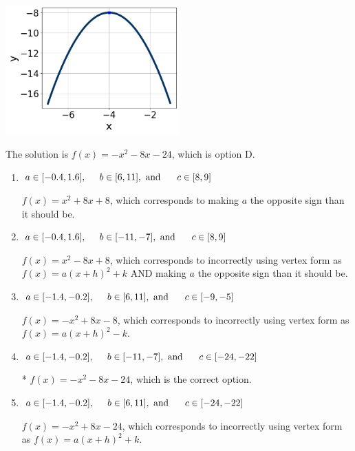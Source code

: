 \documentclass{extbook}[14pt]
\begin{document}
\begin{enumerate}
{\begin{center}
    \includegraphics[width=0.5\textwidth]{../Figures/quadraticGraphToEquationCopyB.png}
\end{center}


The solution is \( f(x) = -x^{2} -8 x -24 \), which is option D.\begin{enumerate}[label=\Alph*.]
\item \( a \in [-0.4, 1.6], \hspace*{5mm} b \in [6, 11], \text{ and } \hspace*{5mm} c \in [8, 9] \)

$f(x)=x^{2} +8 x + 8$, which corresponds to making $a$ the opposite sign than it should be.
\item \( a \in [-0.4, 1.6], \hspace*{5mm} b \in [-11, -7], \text{ and } \hspace*{5mm} c \in [8, 9] \)

$f(x)=x^{2} -8 x + 8$, which corresponds to incorrectly using vertex form as $f(x) = a(x+h)^2+k$ AND making $a$ the opposite sign than it should be.
\item \( a \in [-1.4, -0.2], \hspace*{5mm} b \in [6, 11], \text{ and } \hspace*{5mm} c \in [-9, -5] \)

$f(x)=-x^{2} +8 x -8$, which corresponds to incorrectly using vertex form as $f(x) = a(x+h)^2 - k$.
\item \( a \in [-1.4, -0.2], \hspace*{5mm} b \in [-11, -7], \text{ and } \hspace*{5mm} c \in [-24, -22] \)

* $f(x)=-x^{2} -8 x -24$, which is the correct option.
\item \( a \in [-1.4, -0.2], \hspace*{5mm} b \in [6, 11], \text{ and } \hspace*{5mm} c \in [-24, -22] \)

$f(x)=-x^{2} +8 x -24$, which corresponds to incorrectly using vertex form as $f(x) = a(x+h)^2+k$.
\end{enumerate}

}
\end{enumerate}
\end{document}
